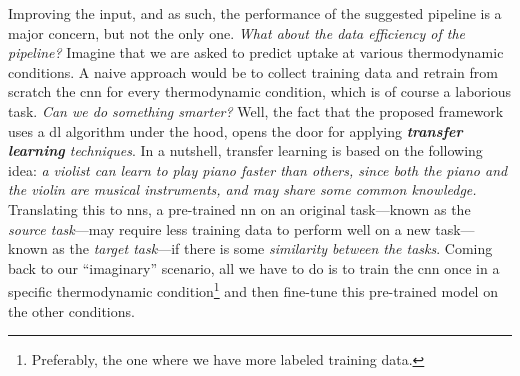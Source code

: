 Improving the input, and as such, the performance of the suggested pipeline is a
major concern, but not the only one. \emph{What about the data
efficiency of the pipeline?} Imagine that we are asked to
predict  uptake at various thermodynamic conditions. A naive approach would be to collect training data and retrain from scratch the \gls{cnn} for every thermodynamic condition,
which is of course a laborious task. \emph{Can we do something smarter?} Well,
the fact that the proposed framework uses a \gls{dl} algorithm under the hood, opens the door for applying
\emph{\textbf{transfer learning} techniques}.  In a
nutshell, transfer learning \parencite{Zhuang2019, Ma2020, Kang2023} is based on
the following idea: \emph{a violist can learn to play piano faster than others,
since both the piano and the violin are musical instruments, and may share some
common knowledge.} Translating this to \glspl{nn}, a pre-trained \gls{nn} on an
original task---known as the \emph{source task}---may require
less training data to perform well on a new task---known as the \emph{target
task}---if there is some \emph{similarity between the tasks}.
Coming back to our ``imaginary'' scenario, all we have to do is to train the
\gls{cnn} once in a specific thermodynamic condition\footnote{Preferably, the
one where we have more labeled training data.} and then
fine-tune this pre-trained model on
the other conditions.

